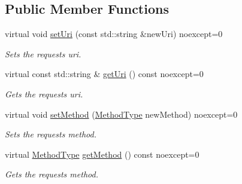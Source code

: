 \subsection*{Public Member Functions}
\begin{DoxyCompactItemize}
\item 
\mbox{\label{structZiApi_1_1HttpRequest_a0a6e036d520b4c43a7350f465c429b20}} 
virtual void \mbox{\hyperlink{structZiApi_1_1HttpRequest_a0a6e036d520b4c43a7350f465c429b20}{set\+Uri}} (const std\+::string \&new\+Uri) noexcept=0
\begin{DoxyCompactList}\small\item\em Sets the request\textquotesingle{}s uri. \end{DoxyCompactList}\item 
\mbox{\label{structZiApi_1_1HttpRequest_aa2830d65539c10f3441d2988eff2f3b8}} 
virtual const std\+::string \& \mbox{\hyperlink{structZiApi_1_1HttpRequest_aa2830d65539c10f3441d2988eff2f3b8}{get\+Uri}} () const noexcept=0
\begin{DoxyCompactList}\small\item\em Gets the request\textquotesingle{}s uri. \end{DoxyCompactList}\item 
\mbox{\label{structZiApi_1_1HttpRequest_a45f2f16405c9572dcd3acf70eb1a9dd1}} 
virtual void \mbox{\hyperlink{structZiApi_1_1HttpRequest_a45f2f16405c9572dcd3acf70eb1a9dd1}{set\+Method}} (\mbox{\hyperlink{structZiApi_1_1HttpRequest_a8592cff867cbbc5cc43bd3a4d6053a1b}{Method\+Type}} new\+Method) noexcept=0
\begin{DoxyCompactList}\small\item\em Sets the request\textquotesingle{}s method. \end{DoxyCompactList}\item 
\mbox{\label{structZiApi_1_1HttpRequest_a783653b01833477dd2ce7a9d6ba306c6}} 
virtual \mbox{\hyperlink{structZiApi_1_1HttpRequest_a8592cff867cbbc5cc43bd3a4d6053a1b}{Method\+Type}} \mbox{\hyperlink{structZiApi_1_1HttpRequest_a783653b01833477dd2ce7a9d6ba306c6}{get\+Method}} () const noexcept=0
\begin{DoxyCompactList}\small\item\em Gets the request\textquotesingle{}s method. \end{DoxyCompactList}\end{DoxyCompactItemize}
